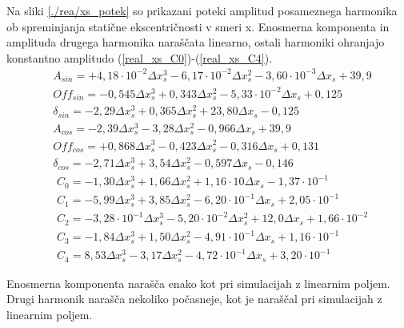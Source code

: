 Na sliki \ref{./rea/xs_potek} so prikazani poteki amplitud posameznega harmonika ob spreminjanja statične ekscentričnosti v smeri x. Enosmerna komponenta in amplituda drugega harmonika naraščata linearno, ostali harmoniki ohranjajo konstantno amplitudo (\ref{real_xs_C0})-(\ref{real_xs_C4}).
\begin{eqnarray}
&A_{sin} = +4,18\cdot 10^{-2}\Delta x_s^3-6,17\cdot 10^{-2}\Delta x_s^2-3,60\cdot 10^{-3}\Delta x_s+39,9\\     
&Off_{sin} = -0,545\Delta x_s^3+0,343\Delta x_s^2-5,33\cdot 10^{-2}\Delta x_s+0,125\\   
&\delta_{sin} = -2,29\Delta x_s^3+0,365\Delta x_s^2+23,80\Delta x_s-0,125\\
&A_{cos} = -2,39\Delta x_s^3-3,28\Delta x_s^2-0,966\Delta x_s+39,9\\     
&Off_{cos} = +0,868\Delta x_s^3-0,423\Delta x_s^2-0,316\Delta x_s+0,131\\   
&\delta_{cos} = -2,71\Delta x_s^3+3,54\Delta x_s^2-0,597\Delta x_s-0,146
\end{eqnarray}
\begin{eqnarray}\label{real_xs_C0}
&C_0 =-1,30\Delta x_s^{3}+1,66\Delta x_s^{2}+1,16\cdot 10\Delta x_s-1,37\cdot 10^{-1} \\                          
&C_1 =-5,99\Delta x_s^{3}+3,85\Delta x_s^{2}-6,20\cdot 10^{-1}\Delta x_s+2,05\cdot 10^{-1} \\                     
&C_2 =-3,28\cdot 10^{-1}\Delta x_s^{3}-5,20\cdot 10^{-2}\Delta x_s^{2}+12,0\Delta x_s+1,66\cdot 10^{-2} \\
&C_3 =-1,84\Delta x_s^{3}+1,50\Delta x_s^{2}-4,91\cdot 10^{-1}\Delta x_s+1,16\cdot 10^{-1} \\
\label{real_xs_C4}                     
&C_4 =8,53\Delta x_s^{3}-3,17\Delta x_s^{2}-4,72\cdot 10^{-1}\Delta x_s+3,20\cdot 10^{-1}
\end{eqnarray}

Enosmerna komponenta narašča enako kot pri simulacijah z linearnim poljem. Drugi harmonik narašča nekoliko počasneje, kot je naraščal pri simulacijah z linearnim poljem. 

